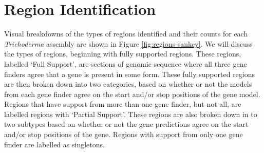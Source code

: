 \section{Region Identification}
\label{section:regions}

Visual breakdowns of the types of regions identified and their counts
for each \textit{Trichoderma} assembly are shown in Figure
\ref{fig:regions-sankey}. We will discuss the types of regions,
beginning with fully supported regions. These regions, labelled `Full
Support', are sections of genomic sequence where all three gene
finders agree that a gene is present in some form. These fully
supported regions are then broken down into two categories, based on
whether or not the models from each gene finder agree on the start
and/or stop positions of the gene model. Regions that have support
from more than one gene finder, but not all, are labelled regions with
`Partial Support'. These regions are also broken down in to two
subtypes based on whether or not the gene predictions agree on the
start and/or stop positions of the gene. Regions with support from
only one gene finder are labelled as singletons.


